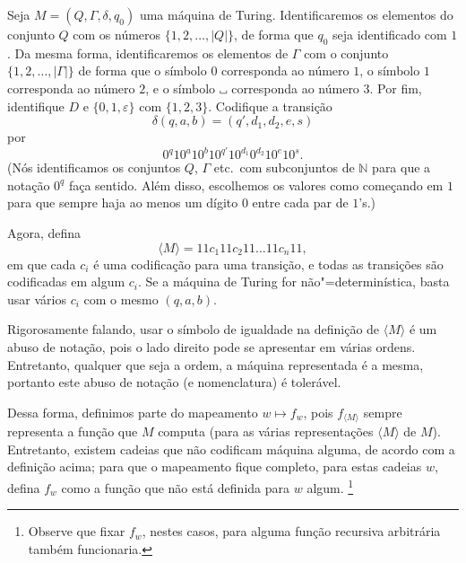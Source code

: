 \begin{definition}
    Seja $M = (Q, \Gamma, \delta, q_0)$ uma máquina de Turing.
    Identificaremos os elementos do conjunto $Q$
    com os números $\{1, 2, \dots, |Q|\}$,
    de forma que $q_0$ seja identificado com $1$.
    Da mesma forma,
    identificaremos os elementos de $\Gamma$
    com o conjunto $\{1, 2, \dots, |\Gamma|\}$
    de forma que o símbolo $0$ corresponda ao número $1$,
    o símbolo $1$ corresponda ao número $2$,
    e o símbolo $\B$ corresponda ao número $3$.
    Por fim, identifique $D$ e $\{0, 1, \varepsilon\}$ com $\{1, 2, 3\}$.
    Codifique a transição
    \begin{equation*}
        \delta(q, a, b) = (q', d_1, d_2, e, s)
    \end{equation*}
    por
    \begin{equation*}
        0^q 1 0^a 1 0^b 1 0^{q'} 1 0^{d_1} 0^{d_2} 1 0^e 1 0^s.
    \end{equation*}
    (Nós identificamos os conjuntos $Q$, $\Gamma$ etc.\ com subconjuntos de $\mathbb N$
    para que a notação $0^q$ faça sentido.
    Além disso,
    escolhemos os valores como começando em $1$
    para que sempre haja ao menos um dígito $0$ entre cada par de $1$'s.)

    Agora,
    defina
    \begin{equation*}
        \langle M \rangle = 11 c_1 11 c_2 11 \dots 11 c_n 11,
    \end{equation*}
    em que cada $c_i$ é uma codificação para uma transição,
    e todas as transições são codificadas em algum $c_i$.
    Se a máquina de Turing for não"=determinística,
    basta usar vários $c_i$ com o mesmo $(q, a, b)$.
\end{definition}

Rigorosamente falando,
usar o símbolo de igualdade na definição de $\langle M \rangle$
é um abuso de notação,
pois o lado direito pode se apresentar em várias ordens.
Entretanto,
qualquer que seja a ordem,
a máquina representada é a mesma,
portanto este abuso de notação (e nomenclatura) é tolerável.

Dessa forma,
definimos parte do mapeamento $w \mapsto f_w$,
pois $f_{\langle M \rangle}$ sempre representa a função que $M$ computa
(para as várias representações $\langle M \rangle$ de $M$).
Entretanto,
existem cadeias que não codificam máquina alguma,
de acordo com a definição acima;
para que o mapeamento fique completo,
para estas cadeias $w$,
defina $f_w$ como a função que não está definida para $w$ algum.%
\footnote{
    Observe que fixar $f_w$,
    nestes casos,
    para alguma função recursiva arbitrária também funcionaria.
}

